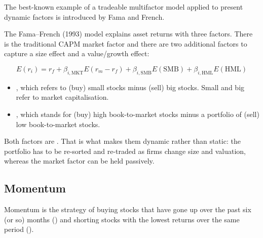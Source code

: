 
The best-known example of a tradeable multifactor model applied to present
dynamic factors is introduced by Fama and French.

The Fama--French (1993) model explains asset returns with three factors. There is
the traditional CAPM market factor and there are two additional factors to
capture a size effect and a value/growth effect:

\begin{imfmlbox}
\[ E(r_i) = r_f + \beta_{i,\text{MKT}}E(r_m - r_f) + \beta_{i,\text{SMB}}E(\text{SMB})
   + \beta_{i,\text{HML}}E(\text{HML}) \]
\end{imfmlbox}

\begin{itemize}
\item {}, which refers to (buy) small stocks minus (sell) big
stocks. Small and big refer to market capitalisation.
\item {}, which stands for (buy) high book-to-market stocks minus
a portfolio of (sell) low book-to-market stocks.
\end{itemize}

\begin{imkeybox}
Both factors are . That is what makes them dynamic rather than
static: the portfolio has to be re-sorted and re-traded as firms change size and
valuation, whereas the market factor can be held passively.
\end{imkeybox}


\subsection{Momentum}

Momentum is the strategy of buying stocks that have gone up over the past six (or
so) months () and shorting stocks with the lowest returns over the
same period ().

